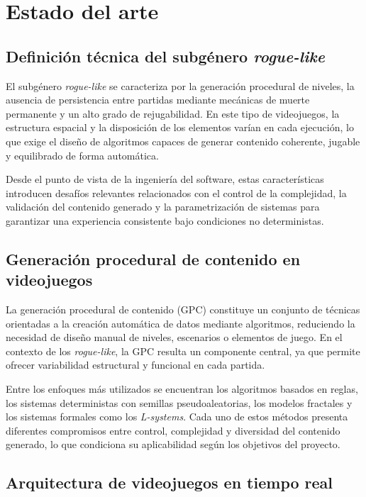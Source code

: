 \chapter{Estado del arte}

\section{Definición técnica del subgénero \textit{rogue-like}}

El subgénero \textit{rogue-like} se caracteriza por la generación procedural de niveles, la ausencia de persistencia entre partidas mediante mecánicas de muerte permanente y un alto grado de rejugabilidad. En este tipo de videojuegos, la estructura espacial y la disposición de los elementos varían en cada ejecución, lo que exige el diseño de algoritmos capaces de generar contenido coherente, jugable y equilibrado de forma automática.

Desde el punto de vista de la ingeniería del software, estas características introducen desafíos relevantes relacionados con el control de la complejidad, la validación del contenido generado y la parametrización de sistemas para garantizar una experiencia consistente bajo condiciones no deterministas.

\section{Generación procedural de contenido en videojuegos}

La generación procedural de contenido (GPC) constituye un conjunto de técnicas orientadas a la creación automática de datos mediante algoritmos, reduciendo la necesidad de diseño manual de niveles, escenarios o elementos de juego. En el contexto de los \textit{rogue-like}, la GPC resulta un componente central, ya que permite ofrecer variabilidad estructural y funcional en cada partida.

Entre los enfoques más utilizados se encuentran los algoritmos basados en reglas, los sistemas deterministas con semillas pseudoaleatorias, los modelos fractales y los sistemas formales como los \textit{L-systems}. Cada uno de estos métodos presenta diferentes compromisos entre control, complejidad y diversidad del contenido generado, lo que condiciona su aplicabilidad según los objetivos del proyecto.

\section{Arquitectura de videojuegos en tiempo real}

